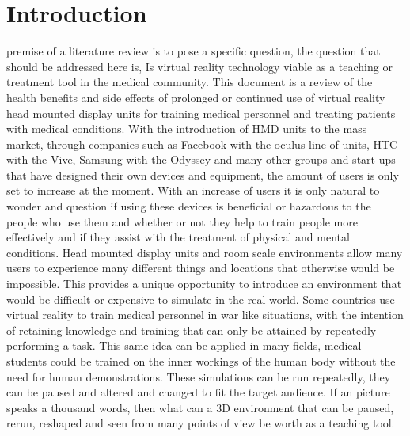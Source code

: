 \documentclass[10pt,journal,compsoc]{IEEEtran}
\begin{document}
	\section{Introduction}
	 premise of a literature review is to pose a specific question, the question that should be addressed here is, Is virtual reality technology viable as a teaching or treatment tool in the medical community. This document is a review of the health benefits and side effects of prolonged or continued use of virtual reality head mounted display units for training medical personnel and treating patients with medical conditions. With the introduction of HMD units to the mass market, through companies such as Facebook with the oculus line of units, HTC with the Vive, Samsung with the Odyssey and many other groups and start-ups that have designed their own devices and equipment, the amount of users is only set to increase at the moment. With an increase of users it is only natural to wonder and question if using these devices is beneficial or hazardous to the people who use them and whether or not they help to train people more effectively and if they assist with the treatment of physical and mental conditions. \newline \newline
	Head mounted display units and room scale environments allow many users to experience many different things and locations that otherwise would be impossible. This provides a unique opportunity to introduce an environment that would be difficult or expensive to simulate in the real world. Some countries use virtual reality to train medical personnel in war like situations, with the intention of retaining knowledge and training that can only be attained by repeatedly performing a task. This same idea can be applied in many fields,  medical students could be trained on the inner workings of the human body without the need for human demonstrations. These simulations can be run repeatedly, they can be paused and altered and changed to fit the target audience. If an picture speaks a thousand words, then what can a 3D environment that can be paused, rerun, reshaped and seen from many points of view be worth as a teaching tool.
	\newline
		
\end{document}
